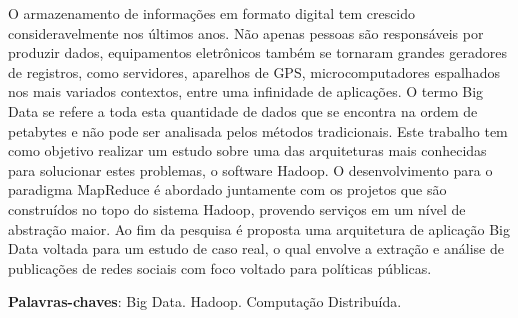 \begin{resumo}

O armazenamento de informações em formato digital tem crescido consideravelmente nos últimos anos. Não apenas pessoas são responsáveis por produzir dados, equipamentos eletrônicos também se tornaram grandes geradores de registros, como servidores, aparelhos de GPS, microcomputadores espalhados nos mais variados contextos, entre uma infinidade de aplicações. O termo Big Data se refere a toda esta quantidade de dados que se encontra na ordem de petabytes e não pode ser analisada pelos métodos tradicionais. Este trabalho tem como objetivo realizar um estudo sobre uma das arquiteturas mais conhecidas para solucionar estes problemas, o software  Hadoop. O desenvolvimento para o paradigma MapReduce é abordado juntamente com os projetos que são construídos no topo do sistema Hadoop, provendo serviços em um nível de abstração maior. Ao fim da pesquisa é proposta uma arquitetura de aplicação Big Data voltada para um estudo de caso real, o qual envolve a extração e análise de publicações de redes sociais com foco voltado para políticas públicas.

 \vspace{\onelineskip}
    
 \noindent
 \textbf{Palavras-chaves}: Big Data. Hadoop. Computação Distribuída.
\end{resumo}
